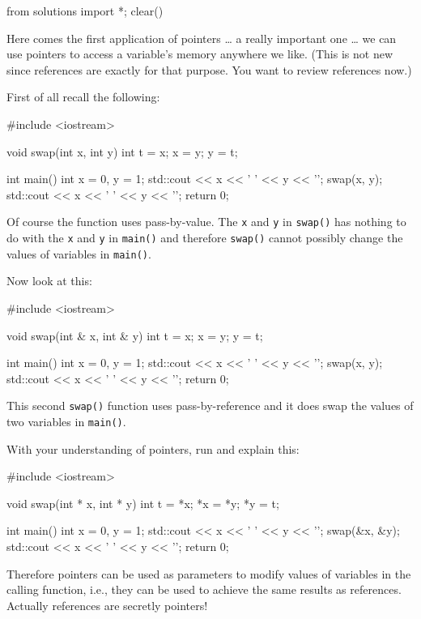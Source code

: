 \begin{python0}
from solutions import *; clear()
\end{python0}

Here comes the first application of pointers \ldots{} a really important one \ldots{} we can use pointers to access a variable's memory anywhere we like. (This is not new since references are exactly for that purpose. You want to review references now.)

First of all recall the following:

\begin{consolethree}[escapeinside=||]
#include <iostream>

void swap(int x, int y)
{
    int t = x;
    x = y;
    y = t;
}

int main()
{   
    int x = 0, y = 1;
    std::cout << x << ' ' << y << '\n';
    swap(x, y);
    std::cout << x << ' ' << y << '\n';
    return 0;
}
\end{consolethree}
Of course the function uses pass-by-value. The \texttt{x} and \texttt{y} in \texttt{swap()} has nothing to do with the \texttt{x} and \texttt{y} in \texttt{main()} and therefore \texttt{swap()} cannot possibly change the values of variables in \texttt{main()}.

Now look at this:

\begin{consolethree}[escapeinside=||]
#include <iostream>

void swap(int & x, int & y)
{    
     int t = x;
     x = y;
     y = t;
}

int main()
{   
    int x = 0, y = 1;
    std::cout << x << ' ' << y << '\n';
    swap(x, y);
    std::cout << x << ' ' << y << '\n';
    return 0;
}
\end{consolethree}
This second \texttt{swap()} function uses pass-by-reference and it does swap the values of two variables in \texttt{main()}.

With your understanding of pointers, run and explain this:

\begin{consolethree}[escapeinside=||]
#include <iostream>

void swap(int * x, int * y)
{    
     int t = *x;
     *x = *y;
     *y = t;
}

int main()
{   
    int x = 0, y = 1;
    std::cout << x << ' ' << y << '\n';
    swap(&x, &y);
    std::cout << x << ' ' << y << '\n';
    return 0;
}
\end{consolethree}
Therefore pointers can be used as parameters to modify values of variables in the calling function, i.e., they can be used to achieve the same results as references. Actually references are secretly pointers!

